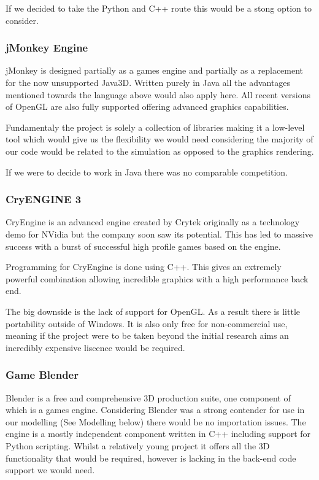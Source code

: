 If we decided to take the Python and C++ route this would be a stong
option to consider.


\subsubsection{jMonkey Engine}

jMonkey is designed partially as a games engine and partially as a
replacement for the now unsupported Java3D. Written purely in Java
all the advantages mentioned towards the language above would also
apply here. All recent versions of OpenGL are also fully supported
offering advanced graphics capabilities.

Fundamentaly the project is solely a collection of libraries making
it a low-level tool which would give us the flexibility we would need
considering the majority of our code would be related to the simulation
as opposed to the graphics rendering.

If we were to decide to work in Java there was no comparable competition.


\subsubsection{CryENGINE 3}

CryEngine is an advanced engine created by Crytek originally as a
technology demo for NVidia but the company soon saw its potential.
This has led to massive success with a burst of successful high profile
games based on the engine.

Programming for CryEngine is done using C++. This gives an extremely
powerful combination allowing incredible graphics with a high performance
back end.

The big downside is the lack of support for OpenGL. As a result there
is little portability outside of Windows. It is also only free for
non-commercial use, meaning if the project were to be taken beyond
the initial research aims an incredibly expensive liscence would be
required.


\subsubsection{Game Blender}

Blender is a free and comprehensive 3D production suite, one component
of which is a games engine. Considering Blender was a strong contender
for use in our modelling (See Modelling below) there would be no importation
issues. The engine is a mostly independent component written in C++
including support for Python scripting. Whilst a relatively young
project it offers all the 3D functionality that would be required,
however is lacking in the back-end code support we would need.


